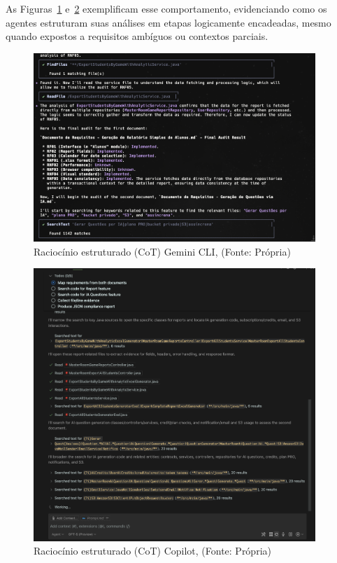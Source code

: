 As Figuras~\ref{fig:gemini_cot} e~\ref{fig:copilot_cot} exemplificam esse comportamento, evidenciando como os agentes estruturam suas análises em etapas logicamente encadeadas, mesmo quando expostos a requisitos ambíguos ou contextos parciais.

\vspace{1em}
\begin{figure}[H]
    \centering
    \includegraphics[width=0.95\textwidth]{imgs/gemini_chain_of_thought.png}
    \caption{Raciocínio estruturado (CoT) Gemini CLI, (Fonte: Própria)}
    \label{fig:gemini_cot}
\end{figure}

\vspace{1em}
\begin{figure}[H]
    \centering
    \includegraphics[width=0.95\textwidth]{imgs/copilot_chain_of_thought.png}
    \caption{Raciocínio estruturado (CoT) Copilot, (Fonte: Própria)}
    \label{fig:copilot_cot}
\end{figure}
